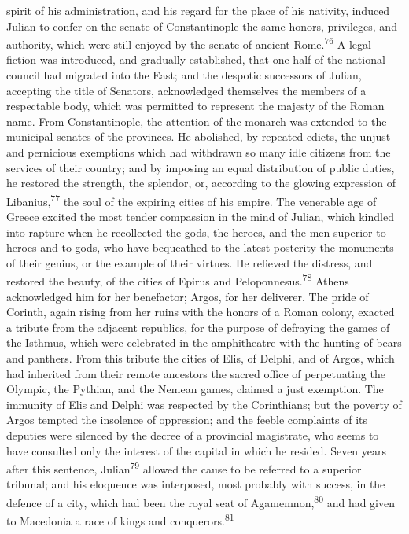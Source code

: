 spirit of his administration, and his regard for the place of his
nativity, induced Julian to confer on the senate of
Constantinople the same honors, privileges, and authority, which
were still enjoyed by the senate of ancient Rome.\textsuperscript{76} A legal
fiction was introduced, and gradually established, that one half
of the national council had migrated into the East; and the
despotic successors of Julian, accepting the title of Senators,
acknowledged themselves the members of a respectable body, which
was permitted to represent the majesty of the Roman name. From
Constantinople, the attention of the monarch was extended to the
municipal senates of the provinces. He abolished, by repeated
edicts, the unjust and pernicious exemptions which had withdrawn
so many idle citizens from the services of their country; and by
imposing an equal distribution of public duties, he restored the
strength, the splendor, or, according to the glowing expression
of Libanius,\textsuperscript{77} the soul of the expiring cities of his empire.
The venerable age of Greece excited the most tender compassion in
the mind of Julian, which kindled into rapture when he
recollected the gods, the heroes, and the men superior to heroes
and to gods, who have bequeathed to the latest posterity the
monuments of their genius, or the example of their virtues. He
relieved the distress, and restored the beauty, of the cities of
Epirus and Peloponnesus.\textsuperscript{78} Athens acknowledged him for her
benefactor; Argos, for her deliverer. The pride of Corinth, again
rising from her ruins with the honors of a Roman colony, exacted
a tribute from the adjacent republics, for the purpose of
defraying the games of the Isthmus, which were celebrated in the
amphitheatre with the hunting of bears and panthers. From this
tribute the cities of Elis, of Delphi, and of Argos, which had
inherited from their remote ancestors the sacred office of
perpetuating the Olympic, the Pythian, and the Nemean games,
claimed a just exemption. The immunity of Elis and Delphi was
respected by the Corinthians; but the poverty of Argos tempted
the insolence of oppression; and the feeble complaints of its
deputies were silenced by the decree of a provincial magistrate,
who seems to have consulted only the interest of the capital in
which he resided. Seven years after this sentence, Julian\textsuperscript{79}
allowed the cause to be referred to a superior tribunal; and his
eloquence was interposed, most probably with success, in the
defence of a city, which had been the royal seat of Agamemnon,\textsuperscript{80}
and had given to Macedonia a race of kings and conquerors.\textsuperscript{81}


